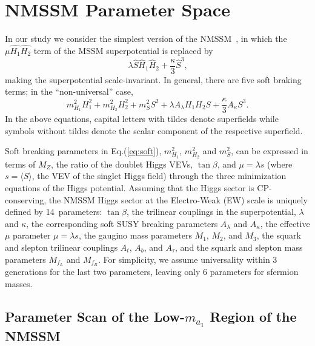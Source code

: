 \documentclass[aps,prl,twocolumn,nofootinbib,superscriptaddress]{revtex4}
\begin{document}
\section{NMSSM Parameter Space}

In our study we consider the simplest version of the
NMSSM~\cite{Nilles:1982dy,Frere:1983ag,Ellis:1988er,Drees:1988fc,Ellwanger:1993hn,Ellwanger:1993xa,Elliott:1993bs,Pandita:1993tg,Ellwanger:1995ru,King:1995vk,Franke:1995tc,Ellwanger:1996gw},
in which the $\mu\widehat{H_1}\widehat{H_2}$ term of the MSSM
superpotential is replaced by
\begin{equation}
\lambda \widehat{S} \widehat{H}_1 \widehat{H}_2 + \frac{\kappa}{3}  \widehat{S}^3 \mbox{,}
\label{eq:superpot} 
\end{equation}
making the superpotential scale-invariant.  In general, there are five
soft braking terms; in the ``non-universal'' case,
\begin{equation}
  m_{H_1}^2 H_1^2 + m_{H_2}^2 H_2^2 + m_{S}^2 S^2 
  + \lambda A_\lambda H_1 H_2 S +  \frac{\kappa}{3} A_\kappa S^3.
\label{eq:soft} 
\end{equation}
In the above equations, capital letters with tildes denote superfields
while symbols without tildes denote the scalar component of the
respective superfield.

Soft breaking parameters in Eq.(\ref{eq:soft}), $m_{H_1}^2$,
$m_{H_2}^2$ and $m_{S}^2$, can be expressed in terms of $M_Z$, the
ratio of the doublet Higgs VEVs, $\tan\beta$, and $\mu = \lambda s$
(where $s = \langle S \rangle$, the VEV of the singlet Higgs field)
through the three minimization equations of the Higgs potential.
Assuming that the Higgs sector is CP-conserving, the NMSSM Higgs
sector at the Electro-Weak (EW) scale is uniquely defined by
14~parameters: $\tan\beta$, the trilinear couplings in the
superpotential, $\lambda$ and $\kappa$, the corresponding soft SUSY
breaking parameters $A_\lambda$ and $A_\kappa$, the effective $\mu$
parameter $\mu = \lambda s$, the gaugino mass parameters $M_1$, $M_2$,
and $M_3$, the squark and slepton trilinear couplings $A_{t}$,
$A_{b}$, and $A_\tau$, and the squark and slepton mass parameters
$M_{f_L}$ and $M_{f_R}$.  For simplicity, we assume universality
within 3 generations for the last two parameters, leaving only 6
parameters for sfermion masses.

\subsection{Parameter Scan of the Low-$m_{a_1}$ Region of the NMSSM}
\end{document}
